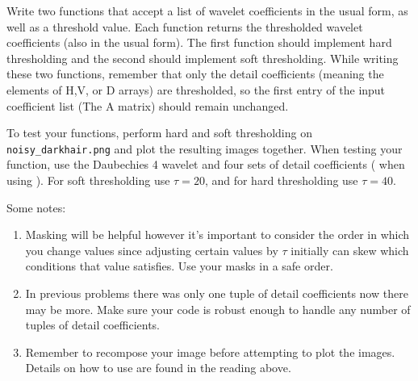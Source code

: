 
\begin{problem}
Write two functions that accept a list of wavelet coefficients in the usual form, as well as a threshold value. Each function returns the thresholded wavelet coefficients (also in the usual form). The first function should implement hard thresholding and the second should implement soft thresholding.
While writing these two functions, remember that only the detail coefficients (meaning the elements of H,V, or D arrays) are thresholded, so the first entry of the input coefficient list (The A matrix) should remain unchanged. 

To test your functions, perform hard and soft thresholding on \texttt{noisy\_darkhair.png} and plot the resulting images together.
When testing your function, use the Daubechies 4 wavelet and four sets of detail coefficients ( when using ).
For soft thresholding use $\tau=20$, and for hard thresholding use $\tau=40$.

\noindent Some notes:
\begin{enumerate}
\item Masking will be helpful however it's important to consider the order in which you change values since adjusting certain values by $\tau$ initially can skew which conditions that value satisfies. Use your masks in a safe order.
\item In previous problems there was only one tuple of detail coefficients now there may be more. Make sure your code is robust enough to handle any number of tuples of detail coefficients.
\item Remember to recompose your image before attempting to plot the images. 
Details on how to use  are found in the reading above.
\end{enumerate}
 
\end{problem}

\begin{comment}
\begin{problem}
Create a noisy version of the Lena image by adding Gaussian
white noise of mean 0 and standard deviation $\sigma = 20$ (i.e. \li{scale=20}).
Compute four levels of the wavelet coefficients using the Daubechies 4 Wavelet,
and input these into your
thresholding functions (with $\tau = 3\sigma$ for the hard threshold,
and $\tau = 3\sigma/2$ for the soft threshold). Reconstruct the
two denoised images, and then plot these together alongside the
noisy image. Your output should match Figure \ref{fig:denoise}.

What do you notice? How does lowering or raising the
threshold affect the reconstructed images? What happens if you use
a different Wavelet?
\end{problem}
\end{comment}


